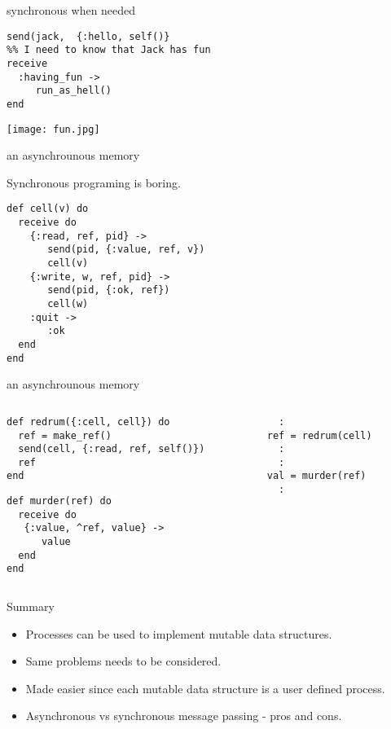 \begin{frame}[fragile]{synchronous when needed}
\begin{verbatim}
send(jack,  {:hello, self()}
%% I need to know that Jack has fun
receive 
  :having_fun ->
     run_as_hell()
end
\end{verbatim}
\pause
\texttt{[image: fun.jpg]}
\end{frame}

\begin{frame}[fragile]{an asynchrounous memory}

Synchronous programing is boring.

\begin{verbatim}
def cell(v) do
  receive do
    {:read, ref, pid} ->
       send(pid, {:value, ref, v})
       cell(v)
    {:write, w, ref, pid} ->
       send(pid, {:ok, ref})
       cell(w)
    :quit ->
       :ok
  end
end
\end{verbatim}

  
\end{frame}

\begin{frame}[fragile]{an asynchrounous memory}

\begin{columns}
 \begin{column}{0.6\linewidth}  
\begin{verbatim}
def redrum({:cell, cell}) do
  ref = make_ref()
  send(cell, {:read, ref, self()})
  ref
end
\end{verbatim} \pause

\begin{verbatim}  
def murder(ref) do
  receive do
   {:value, ^ref, value} -> 
      value
  end
end
\end{verbatim}
 \end{column}
 \pause
 \begin{column}{0.4\linewidth}
\begin{verbatim}  
   :
 ref = redrum(cell) 
   :
   :
 val = murder(ref)
   :
\end{verbatim}

 \end{column}
\end{columns}
\end{frame}


\begin{frame}{Summary}

\begin{itemize}
\item Processes can be used to implement mutable data structures.
\item Same problems needs to be considered. 
\item Made easier since each mutable data structure is a user defined process.
\item Asynchronous vs synchronous message passing - pros and cons.
\end{itemize}

\end{frame}

